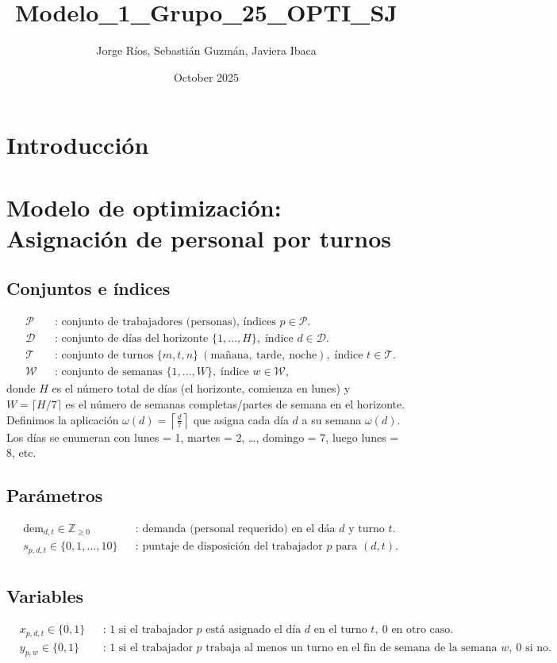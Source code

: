 \documentclass{article}
\title{Modelo_1_Grupo_25_OPTI_SJ}
\author{Jorge Ríos, Sebastián Guzmán, Javiera Ibaca}
\date{October 2025}
\begin{document}
\section*{Introducción}

\section*{Modelo de optimización: Asignación de personal por turnos}

\subsection*{Conjuntos e índices}
\[
\begin{aligned}
&\mathcal{P} &&\text{: conjunto de trabajadores (personas), índices } p\in\mathcal{P}.\\
&\mathcal{D} &&\text{: conjunto de días del horizonte } \{1,\dots,H\},\; \text{índice } d\in\mathcal{D}.\\
&\mathcal{T} &&\text{: conjunto de turnos } \{m,t,n\} \ (\text{mañana},\ \text{tarde},\ \text{noche}),\; \text{índice } t\in\mathcal{T}.\\
&\mathcal{W} &&\text{: conjunto de semanas } \{1,\dots,W\},\; \text{índice } w\in\mathcal{W},
\end{aligned}
\]
donde \(H\) es el número total de d\'ias (el horizonte, comienza en lunes) y \(W=\lceil H/7\rceil\) es el número de semanas completas/partes de semana en el horizonte.  
Definimos la aplicación \(\omega(d)=\left\lceil \frac{d}{7}\right\rceil\) que asigna cada día \(d\) a su semana \(\omega(d)\). Los días se enumeran con lunes = 1, martes = 2, \dots, domingo = 7, luego lunes = 8, etc.

\subsection*{Parámetros}
\[
\begin{aligned}
&\text{dem}_{d,t} \in \mathbb{Z}_{\ge 0} &&\text{: demanda (personal requerido) en el dáa } d \text{ y turno } t.\\
&s_{p,d,t} \in \{0,1,\dots,10\} &&\text{: puntaje de disposición del trabajador } p \text{ para } (d,t).\\
\end{aligned}
\]

\subsection*{Variables}
\[
\begin{aligned}
&x_{p,d,t} \in \{0,1\} &&\text{: 1 si el trabajador } p \text{ está asignado el día } d \text{ en el turno } t,\ \text{0 en otro caso.}\\
&y_{p,w} \in \{0,1\} &&\text{: 1 si el trabajador } p \text{ trabaja al menos un turno en el fin de semana de la semana } w,\ \text{0 si no.}
\end{aligned}
\]
\end{document}
